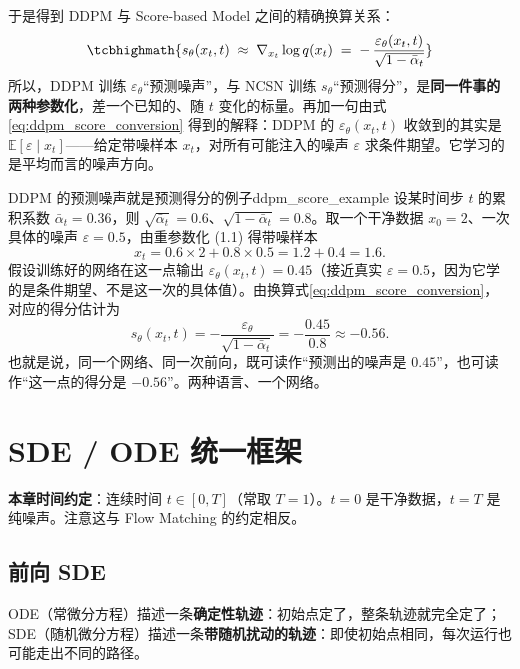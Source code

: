于是得到 DDPM 与 Score-based Model 之间的精确换算关系：
\begin{equation}\label{eq:ddpm_score_conversion}
\tcbhighmath{
s_\theta(x_t, t) \;\approx\; \nabla_{x_t}\log q(x_t)
\;=\; -\,\frac{\varepsilon_\theta(x_t, t)}{\sqrt{1-\bar\alpha_t}}
}
\end{equation}
所以，DDPM 训练 $\varepsilon_\theta$“预测噪声”，与 NCSN 训练 $s_\theta$“预测得分”，是\textbf{同一件事的两种参数化}，差一个已知的、随 $t$ 变化的标量。再加一句由式\eqref{eq:ddpm_score_conversion} 得到的解释：DDPM 的 $\varepsilon_\theta(x_t,t)$ 收敛到的其实是 $\mathbb{E}[\varepsilon\mid x_t]$——给定带噪样本 $x_t$，对所有可能注入的噪声 $\varepsilon$ 求条件期望。它学习的是平均而言的噪声方向。

\begin{example}{DDPM 的预测噪声就是预测得分的例子}{ddpm_score_example}
设某时间步 $t$ 的累积系数 $\bar\alpha_t=0.36$，则 $\sqrt{\bar\alpha_t}=0.6$、$\sqrt{1-\bar\alpha_t}=0.8$。取一个干净数据 $x_0=2$、一次具体的噪声 $\varepsilon=0.5$，由重参数化 (1.1) 得带噪样本
\begin{equation}
x_t=0.6\times2+0.8\times0.5=1.2+0.4=1.6.
\end{equation}
假设训练好的网络在这一点输出 $\varepsilon_\theta(x_t,t)=0.45$（接近真实 $\varepsilon=0.5$，因为它学的是条件期望、不是这一次的具体值）。由换算式\eqref{eq:ddpm_score_conversion}，对应的得分估计为
\begin{equation}
s_\theta(x_t,t)=-\frac{\varepsilon_\theta}{\sqrt{1-\bar\alpha_t}}=-\frac{0.45}{0.8}\approx-0.56.
\end{equation}
也就是说，同一个网络、同一次前向，既可读作“预测出的噪声是 $0.45$”，也可读作“这一点的得分是 $-0.56$”。两种语言、一个网络。
\end{example}

\section{SDE / ODE 统一框架}

\begin{framed}{}
\textbf{本章时间约定}：连续时间 $t\in[0,T]$（常取 $T=1$）。$t=0$ 是干净数据，$t=T$ 是纯噪声。注意这与 Flow Matching 的约定相反。
\end{framed}

\subsection{前向 SDE}

ODE（常微分方程）描述一条\textbf{确定性轨迹}：初始点定了，整条轨迹就完全定了；SDE（随机微分方程）描述一条\textbf{带随机扰动的轨迹}：即使初始点相同，每次运行也可能走出不同的路径。

